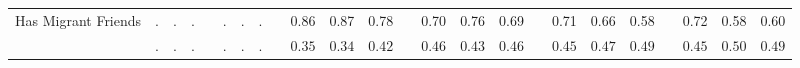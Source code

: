 \begin{center}
{\begin{longtable}{L{12em} c c c p{1.2em} c c c p{1.2em} c c c p{1.2em} c c c p{1.2em} c c c p{1.2em} c c c}
Has Migrant Friends & . &         . &         . & &         . &         . &         . & &      0.86 &      0.87 &      0.78 & &      0.70 &      0.76 &      0.69 & &      0.71 &      0.66 &      0.58 & &      0.72 &      0.58 &      0.60 \\*
& $\mathit{        .}$ & $\mathit{        .}$ & $\mathit{        .}$ & & $\mathit{        .}$ & $\mathit{        .}$ & $\mathit{        .}$ & & $\mathit{     0.35}$ & $\mathit{     0.34}$ & $\mathit{     0.42}$ & & $\mathit{     0.46}$ & $\mathit{     0.43}$ & $\mathit{     0.46}$ & & $\mathit{     0.45}$ & $\mathit{     0.47}$ & $\mathit{     0.49}$ & & $\mathit{     0.45}$ & $\mathit{     0.50}$ & $\mathit{     0.49}$ \\[.7em]
\hline
\end{longtable}
}
\end{center}
